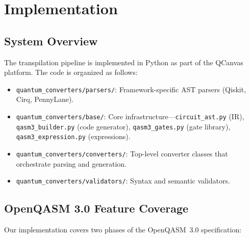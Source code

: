 \documentclass[conference]{IEEEtran}
\begin{document}
\section{Implementation}
\label{sec:implementation}

\subsection{System Overview}

The transpilation pipeline is implemented in Python as part of the QCanvas platform. The code is organized as follows:

\begin{itemize}
    \item \texttt{quantum\_converters/parsers/}: Framework-specific AST parsers (Qiskit, Cirq, PennyLane).
    \item \texttt{quantum\_converters/base/}: Core infrastructure---\texttt{circuit\_ast.py} (IR), \texttt{qasm3\_builder.py} (code generator), \texttt{qasm3\_gates.py} (gate library), \texttt{qasm3\_expression.py} (expressions).
    \item \texttt{quantum\_converters/converters/}: Top-level converter classes that orchestrate parsing and generation.
    \item \texttt{quantum\_converters/validators/}: Syntax and semantic validators.
\end{itemize}

\subsection{OpenQASM 3.0 Feature Coverage}

Our implementation covers two phases of the OpenQASM~3.0 specification:
\end{document}
